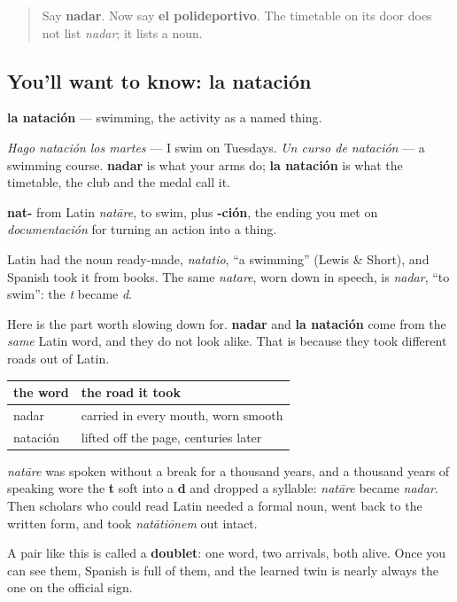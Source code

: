 \label{lesson:ES-C438-natacion}



\begin{quote}
Say \textbf{nadar}. Now say \textbf{el polideportivo}. The timetable on its door does not list \emph{nadar}; it lists a noun.
\end{quote}

\subsection*{You'll want to know: la natación}
\textbf{la natación} — swimming, the activity as a named thing.

\emph{Hago natación los martes} — I swim on Tuesdays. \emph{Un curso de natación} — a swimming course. \textbf{nadar} is what your arms do; \textbf{la natación} is what the timetable, the club and the medal call it.

\begin{cousinweb}
\textbf{nat-} from Latin \emph{natāre}, to swim, plus \textbf{-ción}, the ending you met on \emph{documentación} for turning an action into a thing.

Latin had the noun ready-made, \emph{natatio}, \textquotedblleft{}a swimming\textquotedblright{} (Lewis \& Short), and Spanish took it from books. The same \emph{natare}, worn down in speech, is \emph{nadar}, \textquotedblleft{}to swim\textquotedblright{}: the \emph{t} became \emph{d}.
\end{cousinweb}

\begin{culture}
Here is the part worth slowing down for. \textbf{nadar} and \textbf{la natación} come from the \emph{same} Latin word, and they do not look alike. That is because they took different roads out of Latin.

\noindent
\begin{tabularx}{\linewidth}{@{}>{\raggedright\arraybackslash}X>{\raggedright\arraybackslash}X@{}}
\toprule
\textbf{the word} & \textbf{the road it took} \\
\midrule
nadar & carried in every mouth, worn smooth \\
natación & lifted off the page, centuries later \\
\bottomrule
\end{tabularx}

\emph{natāre} was spoken without a break for a thousand years, and a thousand years of speaking wore the \textbf{t} soft into a \textbf{d} and dropped a syllable: \emph{natāre} became \emph{nadar}. Then scholars who could read Latin needed a formal noun, went back to the written form, and took \emph{natātiōnem} out intact.

A pair like this is called a \textbf{doublet}: one word, two arrivals, both alive. Once you can see them, Spanish is full of them, and the learned twin is nearly always the one on the official sign.
\end{culture}

